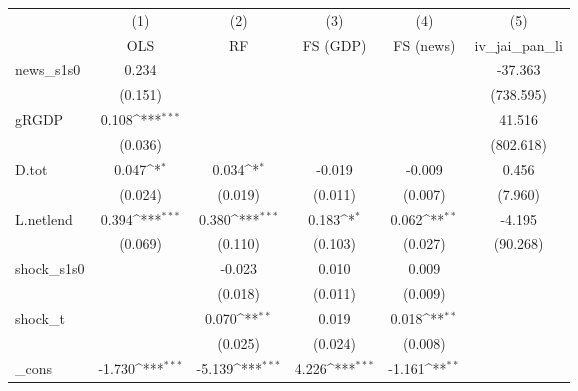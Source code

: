 {
\def\sym#1{\ifmmode^{#1}\else\(^{#1}\)\fi}
\begin{tabular}{l*{5}{c}}
\toprule
            &\multicolumn{1}{c}{(1)}&\multicolumn{1}{c}{(2)}&\multicolumn{1}{c}{(3)}&\multicolumn{1}{c}{(4)}&\multicolumn{1}{c}{(5)}\\
            &\multicolumn{1}{c}{OLS}&\multicolumn{1}{c}{RF}&\multicolumn{1}{c}{FS (GDP)}&\multicolumn{1}{c}{FS (news)}&\multicolumn{1}{c}{iv\_jai\_pan\_li}\\
\midrule
news\_s1s0   &       0.234         &                     &                     &                     &     -37.363         \\
            &     (0.151)         &                     &                     &                     &   (738.595)         \\
\addlinespace
gRGDP       &       0.108\sym{***}&                     &                     &                     &      41.516         \\
            &     (0.036)         &                     &                     &                     &   (802.618)         \\
\addlinespace
D.tot       &       0.047\sym{*}  &       0.034\sym{*}  &      -0.019         &      -0.009         &       0.456         \\
            &     (0.024)         &     (0.019)         &     (0.011)         &     (0.007)         &     (7.960)         \\
\addlinespace
L.netlend   &       0.394\sym{***}&       0.380\sym{***}&       0.183\sym{*}  &       0.062\sym{**} &      -4.195         \\
            &     (0.069)         &     (0.110)         &     (0.103)         &     (0.027)         &    (90.268)         \\
\addlinespace
shock\_s1s0  &                     &      -0.023         &       0.010         &       0.009         &                     \\
            &                     &     (0.018)         &     (0.011)         &     (0.009)         &                     \\
\addlinespace
shock\_t     &                     &       0.070\sym{**} &       0.019         &       0.018\sym{**} &                     \\
            &                     &     (0.025)         &     (0.024)         &     (0.008)         &                     \\
\addlinespace
\_cons      &      -1.730\sym{***}&      -5.139\sym{***}&       4.226\sym{***}&      -1.161\sym{**} &                     \\

\end{tabular}}
